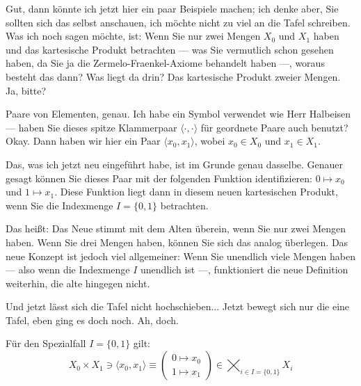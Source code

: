 \begin{spoken-clean}[00:22:27 - 00:24:41]
Gut, dann könnte ich jetzt hier ein paar Beispiele machen; ich denke aber, Sie sollten sich das selbst anschauen, ich möchte nicht zu viel an die Tafel schreiben. Was ich noch sagen möchte, ist: Wenn Sie nur zwei Mengen $X_0$ und $X_1$ haben und das kartesische Produkt betrachten --- was Sie vermutlich schon gesehen haben, da Sie ja die Zermelo-Fraenkel-Axiome behandelt haben ---, woraus besteht das dann? Was liegt da drin? Das kartesische Produkt zweier Mengen. Ja, bitte?


Paare von Elementen, genau. Ich habe ein Symbol verwendet wie Herr Halbeisen --- haben Sie dieses spitze Klammerpaar $\langle \cdot, \cdot \rangle$ für geordnete Paare auch benutzt? Okay. Dann haben wir hier ein Paar $\langle x_0, x_1 \rangle$, wobei $x_0 \in X_0$ und $x_1 \in X_1$.

Das, was ich jetzt neu eingeführt habe, ist im Grunde genau dasselbe. Genauer gesagt können Sie dieses Paar mit der folgenden Funktion identifizieren: $0 \mapsto x_0$ und $1 \mapsto x_1$. Diese Funktion liegt dann in diesem neuen kartesischen Produkt, wenn Sie die Indexmenge $I = \{0, 1\}$ betrachten.

Das heißt: Das Neue stimmt mit dem Alten überein, wenn Sie nur zwei Mengen haben. Wenn Sie drei Mengen haben, können Sie sich das analog überlegen. Das neue Konzept ist jedoch viel allgemeiner: Wenn Sie unendlich viele Mengen haben --- also wenn die Indexmenge $I$ unendlich ist ---, funktioniert die neue Definition weiterhin, die alte hingegen nicht.

Und jetzt lässt sich die Tafel nicht hochschieben... Jetzt bewegt sich nur die eine Tafel, eben ging es doch noch. Ah, doch.

\end{spoken-clean}

\begin{math-stroke}
Für den Spezialfall $I = \{0, 1\}$ gilt:
\begin{equation}
\label{eq:special-case-two-sets}
X_0 \times X_1 \ni \langle x_0, x_1 \rangle \equiv \begin{pmatrix} 0 \mapsto x_0 \\ 1 \mapsto x_1 \end{pmatrix} \in \bigtimes_{i \in I = \{0, 1\}} X_i
\end{equation}
\end{math-stroke}

